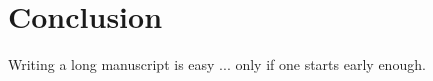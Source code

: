 \chapter{Conclusion}
\label{chap:conclude}

Writing a long manuscript is easy ... only if one starts early enough. 






















